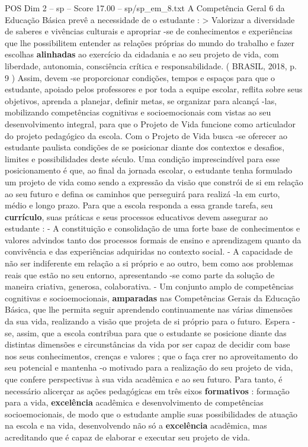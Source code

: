 \begin{textsample}{POS Dim 2 – sp – Score 17.00 – sp/sp\_em\_8.txt}
A Competência Geral 6 da Educação Básica prevê a necessidade de o estudante : > Valorizar a diversidade de saberes e vivências culturais e apropriar -se de conhecimentos e experiências que lhe possibilitem entender as relações próprias do mundo do trabalho e fazer escolhas \textbf{alinhadas} ao exercício da cidadania e ao seu projeto de vida, com liberdade, autonomia, consciência crítica e responsabilidade. ( BRASIL, 2018, p. 9 ) Assim, devem -se proporcionar condições, tempos e espaços para que o estudante, apoiado pelos professores e por toda a equipe escolar, reflita sobre seus objetivos, aprenda a planejar, definir metas, se organizar para alcançá -las, mobilizando competências cognitivas e socioemocionais com vistas ao seu desenvolvimento integral, para que o Projeto de Vida funcione como articulador do projeto pedagógico da escola.
Com o Projeto de Vida busca -se oferecer ao estudante paulista condições de se posicionar diante dos contextos e desafios, limites e possibilidades deste século.
Uma condição imprescindível para esse posicionamento é que, ao final da jornada escolar, o estudante tenha formulado um projeto de vida como sendo a expressão da visão que constrói de si em relação ao seu futuro e defina os caminhos que perseguirá para realizá -la em curto, médio e longo prazo.
Para que a escola responda a essa grande tarefa, seu \textbf{currículo}, suas práticas e seus processos educativos devem assegurar ao estudante : - A constituição e consolidação de uma forte base de conhecimentos e valores advindos tanto dos processos formais de ensino e aprendizagem quanto da convivência e das experiências adquiridas no contexto social. - A capacidade de não ser indiferente em relação a si próprio e ao outro, bem como aos problemas reais que estão no seu entorno, apresentando -se como parte da solução de maneira criativa, generosa, colaborativa. - Um conjunto amplo de competências cognitivas e socioemocionais, \textbf{amparadas} nas Competências Gerais da Educação Básica, que lhe permita seguir aprendendo continuamente nas várias dimensões da sua vida, realizando a visão que projeta de si próprio para o futuro.
Espera -se, assim, que a escola contribua para que o estudante se posicione diante das distintas dimensões e circunstâncias da vida por ser capaz de decidir com base nos seus conhecimentos, crenças e valores ; que o faça crer no aproveitamento do seu potencial e mantenha -o motivado para a realização do seu projeto de vida, que confere perspectivas à sua vida acadêmica e ao seu futuro.
Para tanto, é necessário alicerçar as ações pedagógicas em três eixos \textbf{formativos} : formação para a vida, \textbf{excelência} acadêmica e desenvolvimento de competências socioemocionais, de modo que o estudante amplie suas possibilidades de atuação na escola e na vida, desenvolvendo não só a \textbf{excelência} acadêmica, mas acreditando que é capaz de elaborar e executar seu projeto de vida.

\end{textsample}

